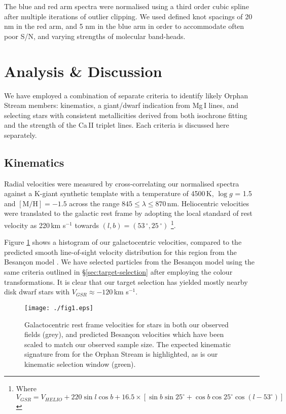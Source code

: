 \documentclass[10pt,apjl]{emulateapj}
\begin{document}
The blue and red arm spectra were normalised using a third order cubic spline after multiple iterations of outlier clipping. We used defined knot spacings of 20 nm in the red arm, and 5 nm in the blue arm in order to accommodate often poor S/N, and varying strengths of molecular band-heads.

\section{Analysis \& Discussion}
\label{sec:analysis}

We have employed a combination of separate criteria to identify likely Orphan Stream members: kinematics, a giant/dwarf indication from Mg\,\textsc{I} lines, and selecting stars with consistent metallicities derived from both isochrone fitting and the strength of the Ca\,\textsc{II} triplet lines. Each criteria is discussed here separately.

\subsection{Kinematics}
Radial velocities were measured by cross-correlating our normalised spectra against a K-giant synthetic template with a temperature of 4500\,K, $\log{g}$ = 1.5 and $[\mbox{M/H}] = -1.5$ across the range $845 \leq \lambda \leq 870$\,nm. Heliocentric velocities were translated to the galactic rest frame by adopting the local standard of rest velocity as 220\,km s$^{-1}$ towards $(l, b) = (53\,^\circ, 25\,^\circ)$ \citep{Kerr_Lynden-Bell_1986, Mihalas_Binney_1981}\footnote{Where $V_{GSR} = V_{HELIO} + 220\sin{l}\cos{b} + 16.5\times[\sin{b}\sin{25^\circ} + \cos{b}\cos{25^\circ}\cos{(l - 53^\circ)}]$}.

Figure \ref{fig:velocities} shows a histogram of our galactocentric velocities, compared to the predicted smooth line-of-sight velocity distribution for this region from the Besan\c{c}on model \citep{Robin_et-al_2003}. We have selected particles from the Besan\c{c}on model using the same criteria outlined in \S\ref{sec:target-selection} after employing the \citet{Jordi_et-al_2006} colour transformations. It is clear that our target selection has yielded mostly nearby disk dwarf stars with $V_{GSR} \approx -120$\,km s$^{-1}$.

\begin{figure}[h]
	\texttt{[image: ./fig1.eps]}
	\caption{Galactocentric rest frame velocities for stars in both our observed fields (grey), and predicted Besan\c{c}on velocities which have been scaled to match our observed sample size. The expected kinematic signature from \citet{Newberg_et-al_2010} for the Orphan Stream is highlighted, as is our kinematic selection window (green).}
	\label{fig:velocities}
\end{figure}
 
\end{document}
